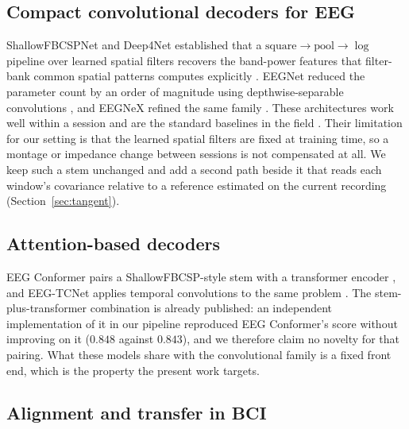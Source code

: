 \documentclass[a4paper,fleqn]{cas-dc}
\begin{document}
\subsection{Compact convolutional decoders for EEG}

ShallowFBCSPNet and Deep4Net established that a
$\mathrm{square} \rightarrow \mathrm{pool} \rightarrow \log$ pipeline over
learned spatial filters recovers the band-power features that filter-bank common
spatial patterns computes explicitly \citep{schirrmeister}. EEGNet reduced the
parameter count by an order of magnitude using depthwise-separable convolutions
\citep{lawhern}, and EEGNeX refined the same family \citep{eegnex}. These
architectures work well within a session and are the standard baselines in the
field \citep{roy_review,craik}. Their limitation for our setting is that the
learned spatial filters are fixed at training time, so a montage or impedance
change between sessions is not compensated at all. We keep such a stem
unchanged and add a second path beside it that reads each window's covariance
relative to a reference estimated on the current recording
(Section~\ref{sec:tangent}).

\subsection{Attention-based decoders}

EEG Conformer pairs a ShallowFBCSP-style stem with a
transformer encoder \citep{conformer}, and EEG-TCNet applies temporal
convolutions to the same problem \citep{eegtcnet}. The stem-plus-transformer combination is already published: an independent
implementation of it in our pipeline reproduced EEG Conformer's score without improving on it ($0.848$ against $0.843$), and we therefore claim no
novelty for that pairing. What these models share with the convolutional family
is a fixed front end, which is the property the present work targets.

\subsection{Alignment and transfer in BCI}
\end{document}
